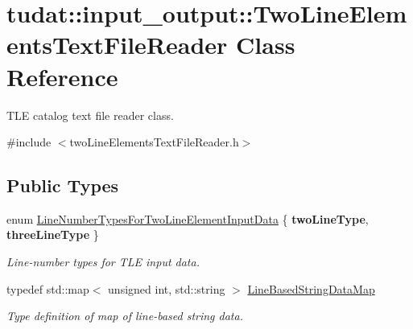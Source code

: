 \hypertarget{classtudat_1_1input__output_1_1TwoLineElementsTextFileReader}{}\section{tudat\+:\+:input\+\_\+output\+:\+:Two\+Line\+Elements\+Text\+File\+Reader Class Reference}
\label{classtudat_1_1input__output_1_1TwoLineElementsTextFileReader}


T\+LE catalog text file reader class.  




{\ttfamily \#include $<$two\+Line\+Elements\+Text\+File\+Reader.\+h$>$}

\subsection*{Public Types}
\begin{DoxyCompactItemize}
\item 
enum \hyperlink{classtudat_1_1input__output_1_1TwoLineElementsTextFileReader_a9db390faac8ed1943fa3ded4161a88e5}{Line\+Number\+Types\+For\+Two\+Line\+Element\+Input\+Data} \{ {\bfseries two\+Line\+Type}, 
{\bfseries three\+Line\+Type}
 \}\hypertarget{classtudat_1_1input__output_1_1TwoLineElementsTextFileReader_a9db390faac8ed1943fa3ded4161a88e5}{}\label{classtudat_1_1input__output_1_1TwoLineElementsTextFileReader_a9db390faac8ed1943fa3ded4161a88e5}
\begin{DoxyCompactList}\small\item\em Line-\/number types for T\+LE input data. \end{DoxyCompactList}
\item 
typedef std\+::map$<$ unsigned int, std\+::string $>$ \hyperlink{classtudat_1_1input__output_1_1TwoLineElementsTextFileReader_ae6d9157e1d7836a8134b99a19585c8bd}{Line\+Based\+String\+Data\+Map}
\begin{DoxyCompactList}\small\item\em Type definition of map of line-\/based string data. \end{DoxyCompactList}\end{DoxyCompactItemize}
